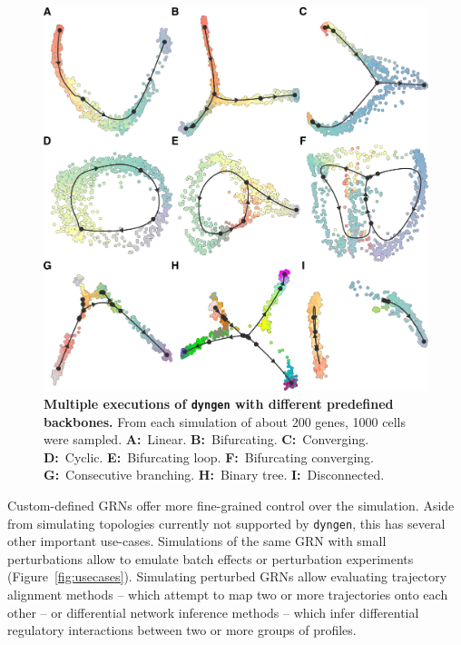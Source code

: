 \begin{figure}[ht]
	\centering
	\includegraphics[width=\LARgefigure]{fig/example_runs_2} 
	\caption{
		\textbf{Multiple executions of \texttt{dyngen} with different predefined backbones.} From each simulation of about 200 genes, 1000 cells were sampled. 
		\textbf{A:}~Linear. \textbf{B:}~Bifurcating. \textbf{C:}~Converging.
		\textbf{D:}~Cyclic. \textbf{E:}~Bifurcating loop. \textbf{F:}~Bifurcating converging.
		\textbf{G:}~Consecutive branching. \textbf{H:}~Binary tree. \textbf{I:}~Disconnected.
	}
	\label{fig:example_runs}
\end{figure}

Custom-defined GRNs offer more fine-grained control over the simulation.
Aside from simulating topologies currently not supported by \texttt{dyngen}, this has several other important use-cases. Simulations of the same GRN with small perturbations allow to emulate batch effects or perturbation experiments (Figure~\ref{fig:usecases}). 
Simulating perturbed GRNs allow evaluating trajectory alignment methods -- which attempt to map two or more trajectories onto each other -- or differential network inference methods -- which infer differential regulatory interactions between two or more groups of profiles.


